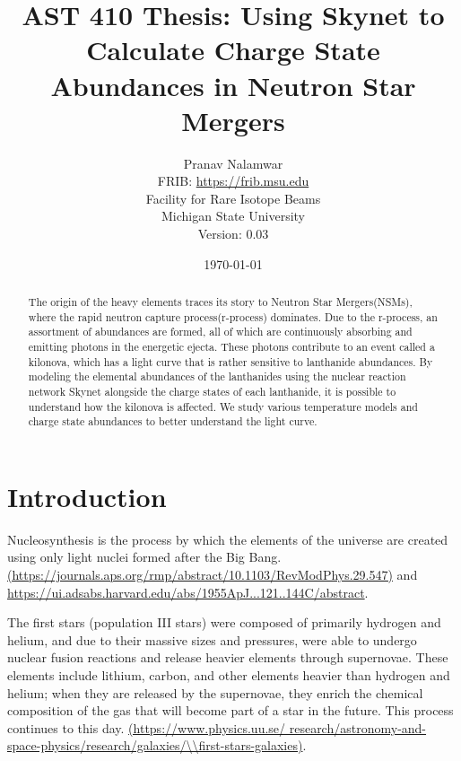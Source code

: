 \documentclass[11pt,a4paper]{article}
\begin{document}
\title{AST 410 Thesis: Using Skynet to Calculate Charge State Abundances in Neutron Star Mergers}

\author{Pranav Nalamwar\\FRIB: \url{https://frib.msu.edu}\\Facility for Rare Isotope Beams\\Michigan State University\\Version: 0.03} 
\date{\today}
\maketitle

\setlength{\parindent}{5ex}
\setlength{\parskip}{1em}


\begin{abstract}
The origin of the heavy elements traces its story to Neutron Star Mergers(NSMs), where the rapid neutron capture process(r-process) dominates. Due to the r-process, an assortment of abundances are formed, all of which are continuously absorbing and emitting photons in the energetic ejecta. These photons contribute to an event called a kilonova, which has a light curve that is rather sensitive to lanthanide abundances. By modeling the elemental abundances of the lanthanides using the nuclear reaction network Skynet alongside the charge states of each lanthanide, it is possible to understand how the kilonova is affected. We study various temperature models and charge state abundances to better understand the light curve. 

\end{abstract}


\section{Introduction}

\hspace{8mm}  Nucleosynthesis is the process by which the elements of the universe are created using only light nuclei formed after the Big Bang. \url{(https://journals.aps.org/rmp/abstract/10.1103/RevModPhys.29.547)} and \url{https://ui.adsabs.harvard.edu/abs/1955ApJ...121..144C/abstract}.  

The first stars (population III stars) were composed of primarily hydrogen and helium, and due to their massive sizes and pressures, were able to undergo nuclear fusion reactions and release heavier elements through supernovae. These elements include lithium, carbon, and other elements heavier than hydrogen and helium; when they are released by the supernovae, they enrich the chemical composition of the gas that will become part of a star in the future. This process continues to this day. \url{(https://www.physics.uu.se/ research/astronomy-and-space-physics/research/galaxies/\\first-stars-galaxies)}. 
\end{document}

